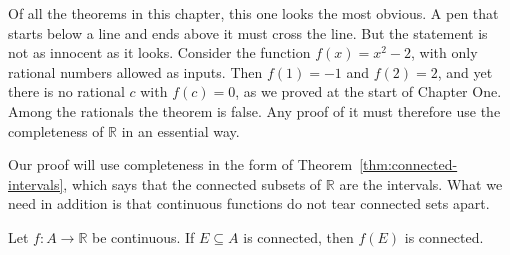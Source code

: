 \begin{marginfigure}
\centering
{}
\caption{To get from the height $f(a)$ to the height $f(b)$, a continuous graph must cross every level $L$ in between.}
\end{marginfigure}

Of all the theorems in this chapter, this one looks the most obvious.  A pen that starts below a line and ends above it must cross the line.  But the statement is not as innocent as it looks.  Consider the function $f(x) = x^2 - 2$, with only rational numbers allowed as inputs.  Then $f(1) = -1$ and $f(2) = 2$, and yet there is no rational $c$ with $f(c) = 0$, as we proved at the start of Chapter One.  Among the rationals the theorem is false.  Any proof of it must therefore use the completeness of $\mathbb{R}$ in an essential way.

Our proof will use completeness in the form of Theorem~\ref{thm:connected-intervals}, which says that the connected subsets of $\mathbb{R}$ are the intervals.  What we need in addition is that continuous functions do not tear connected sets apart.

\begin{theorem}\label{thm:preserve-connected}
Let $f : A \to \mathbb{R}$ be continuous.  If $E \subseteq A$ is connected, then $f(E)$ is connected.
\end{theorem}

